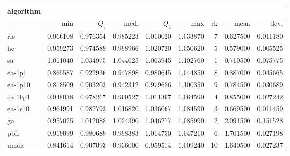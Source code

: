 \begin{tabular}{@{}l*{5}{>{{}}N{1}{2}}>{{}}N{2}{0}>{{}}N{1}{2}>{{}}N{1}{2}@{}}
\toprule
{algorithm} &  &  \\
\midrule
& {min} & {$Q_1$} & {med.} & {$Q_3$} & {max} & {rk} & {mean} & {dev.} \\
\midrule
rls & 0.966108 & 0.976354 & 0.985223 & 1.010020 & 1.033870 & 7 & 0.627500 & 0.011180 \\
 hc & 0.959273 & 0.974589 & 0.998966 & 1.020720 & 1.050620 & 5 & 0.579000 & 0.005525 \\
 sa & {\color{blue}} 1.011040 & {\color{blue}} 1.034975 & {\color{blue}} 1.044625 & {\color{blue}} 1.063945 & {\color{blue}} 1.102760 & 1 & 0.710500 & 0.075775 \\
 ea-1p1 & 0.865587 & 0.922936 & 0.947898 & 0.980645 & 1.044850 & 8 & 0.887000 & 0.045665 \\
 ea-1p10 & 0.818509 & 0.903203 & 0.942312 & 0.979686 & 1.100350 & 9 & 0.784500 & 0.030689 \\
 ea-10p1 & 0.948038 & 0.978267 & 0.999527 & 1.011367 & 1.064590 & 4 & 0.855000 & 0.027242 \\
 ea-1c10 & 0.961991 & 0.982793 & 1.016820 & 1.036067 & 1.084590 & 3 & 0.669500 & 0.011459 \\
 ga & 0.957025 & 1.012088 & 1.024390 & 1.046277 & 1.085990 & 2 & 2.091500 & 0.151528 \\
 pbil & 0.919099 & 0.980689 & 0.998383 & 1.014750 & 1.047210 & 6 & 1.701500 & 0.027198 \\
 umda & 0.841614 & 0.907093 & 0.936000 & 0.959514 & 1.009240 & 10 & 1.640500 & 0.027237 \\
 \bottomrule
\end{tabular}
